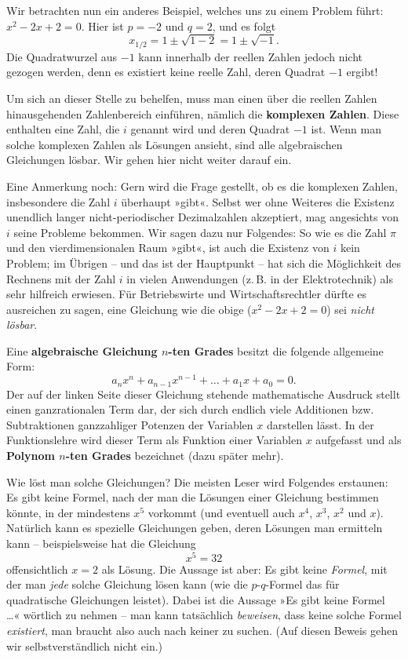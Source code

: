 Wir betrachten nun ein anderes Beispiel, welches uns zu einem Problem führt: $x^2 - 2x + 2 = 0$. Hier ist $p = -2$ und $q = 2$, und es folgt
\[ x_{1/2} = 1 \pm \sqrt{1 - 2} = 1 \pm \sqrt{-1} . \]
Die Quadratwurzel aus $-1$ kann innerhalb der reellen Zahlen jedoch nicht gezogen werden, denn es existiert keine reelle Zahl, deren Quadrat $-1$ ergibt!

Um sich an dieser Stelle zu behelfen, muss man einen über die reellen Zahlen hinausgehenden Zahlenbereich einführen, nämlich die \textbf{komplexen Zahlen}. Diese enthalten eine Zahl, die $i$ genannt wird und deren Quadrat $-1$ ist. Wenn man solche komplexen Zahlen als Lösungen ansieht, sind alle algebraischen Gleichungen lösbar. Wir gehen hier nicht weiter darauf ein.

Eine Anmerkung noch: Gern wird die Frage gestellt, ob es die komplexen Zahlen, insbesondere die Zahl $i$ überhaupt »gibt«. Selbst wer ohne Weiteres die Existenz unendlich langer nicht-periodischer Dezimalzahlen akzeptiert, mag angesichts von $i$ seine Probleme bekommen. Wir sagen dazu nur Folgendes: So wie es die Zahl $\pi$ und den vierdimensionalen Raum »gibt«, ist auch die Existenz von $i$ kein Problem; im Übrigen -- und das ist der Hauptpunkt -- hat sich die Möglichkeit des Rechnens mit der Zahl $i$ in vielen Anwendungen (z.\,B. in der Elektrotechnik) als sehr hilfreich erwiesen. Für Betriebswirte und Wirtschaftsrechtler dürfte es ausreichen zu sagen, eine Gleichung wie die obige ($x^2 - 2x + 2 = 0$) sei \emph{nicht lösbar}.

Eine \textbf{algebraische Gleichung $n$-ten Grades} besitzt die folgende allgemeine Form:
\[ a_n x^n + a_{n-1} x^{n-1} + \ldots + a_1 x + a_0 = 0 . \]
Der auf der linken Seite dieser Gleichung stehende mathematische Ausdruck stellt einen ganzrationalen Term dar, der sich durch endlich viele Additionen bzw. Subtraktionen ganzzahliger Potenzen der Variablen $x$ darstellen lässt. In der Funktionslehre wird dieser Term als Funktion einer Variablen $x$ aufgefasst und als \textbf{Polynom $n$-ten Grades} bezeichnet (dazu später mehr).

Wie löst man solche Gleichungen? Die meisten Leser wird Folgendes erstaunen: Es gibt keine Formel, nach der man die Lösungen einer Gleichung bestimmen könnte, in der mindestens $x^5$ vorkommt (und eventuell auch $x^4$, $x^3$, $x^2$ und $x$). Natürlich kann es spezielle Gleichungen geben, deren Lösungen man ermitteln kann -- beispielsweise hat die Gleichung
\[ x^5 = 32 \]
offensichtlich $x = 2$ als Lösung. Die Aussage ist aber: Es gibt keine \emph{Formel}, mit der man \emph{jede} solche Gleichung lösen kann (wie die $p$-$q$-Formel das für quadratische Gleichungen leistet). Dabei ist die Aussage »Es gibt keine Formel …« wörtlich zu nehmen -- man kann tatsächlich \emph{beweisen}, dass keine solche Formel \emph{existiert}, man braucht also auch nach keiner zu suchen. (Auf diesen Beweis gehen wir selbstverständlich nicht ein.)

